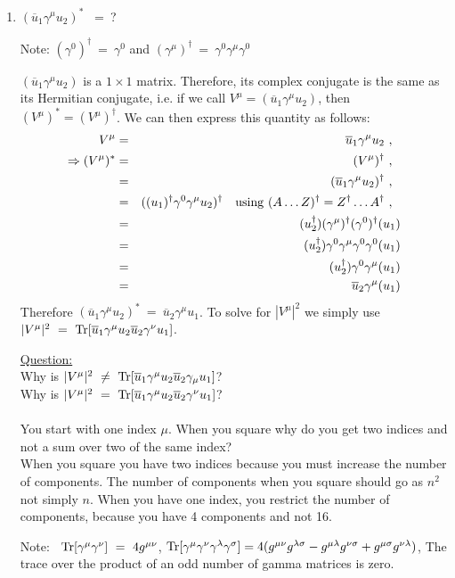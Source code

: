 \documentclass[12pt]{article}
\def \bea{\begin{eqnarray}}
\def \eea{\end{eqnarray}}
\def \Tr{{\rm Tr}}
\def \ou{\overline{u}}
\def \ga{\gamma}
\def \la{\lambda}
\def \si{\sigma}
\begin{document}
\begin{enumerate}

\item$(\ou_1\ga^\mu u_2)^*$ ~=~?

Note: $(\ga^0)^\dag~=~\ga^0$ and $(\ga^\mu)^\dag~=~ \ga^0\ga^\mu\ga^0$

$(\ou_1\ga^\mu u_2)$ is a $1\times1$ matrix. Therefore, its complex conjugate is the same as its Hermitian conjugate, i.e. if we call
$V^\mu = (\ou_1\ga^\mu u_2)$, then $(V^\mu)^* = (V^\mu)^\dag$. We can then express this quantity as follows:
\bea
V^\mu &=& \ou_1\ga^\mu u_2 ~,~~ \\
\Rightarrow (V^\mu)^* &=& (V^\mu)^\dag ~,~~ \\
&=& (\ou_1\ga^\mu u_2)^\dag ~,~~ \\
&=& ((u_1)^\dag\ga^0\ga^\mu u_2)^\dag ~~~{\rm using}~(A\ldots Z)^\dag = Z^\dag\ldots A^\dag ~,~~ \\
&=& (u_2^\dag)(\ga^\mu)^\dag(\ga^0)^\dag(u_1)\\
&=& (u_2^\dag)\ga^0\ga^\mu\ga^0\ga^0(u_1)\\
&=& (u_2^\dag)\ga^0\ga^\mu(u_1)\\
&=& \ou_2\ga^\mu(u_1)
\eea
Therefore $(\ou_1\ga^\mu u_2)^*~=~\ou_2\ga^\mu u_1 $. To solve for $|V^\mu|^2$ we simply use $|V^\mu|^2 ~=~ \Tr[\ou_1 \ga^\mu u_2 \ou_2 \ga^\nu u_1]$.


\underline{Question:} \\
Why is $|V^\mu|^2 ~\ne~ \Tr[\ou_1 \ga^\mu u_2 \ou_2 \ga_\mu u_1]$? \\
Why is $|V^\mu|^2 ~=~ \Tr[\ou_1 \ga^\mu u_2 \ou_2 \ga^\nu u_1]$? \\ \\

You start with one index $\mu$. When you square why do you get two indices and not a sum over two of the same index? \\
When you square you have two indices because you must increase the number of components. The number of components when you square should go as $n^2$ not simply $n$. When you have one index, you restrict the number of components, because you have 4 components and not 16.

\bigskip

Note: ~$\Tr[\ga^\mu\ga^\nu]~=~4 g^{\mu\nu}$, $\Tr[\ga^\mu \ga^\nu \ga^\la \ga^\si]= 4(g^{\mu\nu}g^{\la\si} - g^{\mu\la} g^{\nu\si} + g^{\mu\si}g^{\nu\la})$, The trace over the product of an odd number of gamma matrices is zero.


\end{enumerate}
\end{document}
